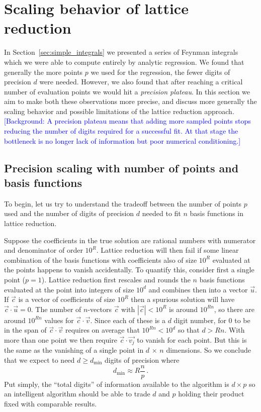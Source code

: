 \documentclass[a4paper,11pt]{article}
\newcommand{\dmin}{d_{\text{min}}}
\begin{document}
\section{Scaling behavior of lattice reduction}\label{sec:lll_limitations}

In Section~\ref{sec:simple_integrals} we presented a series of Feynman integrals which we were able to compute entirely by analytic regression. We found that generally the more points $p$ we used for the regression, the fewer digits of precision $d$ were needed. However, we also found that after reaching a critical number of evaluation points we would hit a \textit{precision plateau}. In this section we aim to make both these observations more precise, and discuss more generally the scaling behavior and possible limitations of  the lattice reduction approach.
\textcolor{blue}{\small [Background: A precision plateau means that adding more sampled points stops reducing the number of digits required for a successful fit. At that stage the bottleneck is no longer lack of information but poor numerical conditioning.]}



\subsection{Precision scaling with number of points and basis functions}\label{sec:p_d_scaling}


To begin, let us try to understand the tradeoff between the number of points $p$ used and the number of digits of precision $d$ needed to fit $n$ basis functions in lattice reduction.

Suppose the coefficients in the true solution are rational numbers with numerator and denominator of order $10^R$. Lattice reduction will then fail if some linear combination of the basis functions with coefficients also of size $10^R$ evaluated at the points happens to vanish accidentally. To quantify this, consider first a single point ($p=1$). Lattice reduction first rescales and rounds the $n$ basis functions evaluated at the point into integers of size $10^d$ and combines then into a vector $\vec{u}$. If $\vec{c}$ is a vector of coefficients of size $10^R$ then a spurious solution will have $\vec{c} \cdot \vec{u}=0$. The number of $n$-vectors $\vec{c}$ with $|\vec{c}| < 10^R$ is around $10^{Rn}$, so there are around $10^{Rn}$ values for $\vec{c} \cdot \vec{v}$. Since each of these is a $d$ digit number, for 0 to be in the span of $\vec{c} \cdot \vec{v}$  requires on average that $10^{Rn} < 10^d$ so that $d> R n$. With more than one point we then require 
$\vec{c} \cdot \vec{v_j}$ to vanish for each point. But this is the same as the vanishing of a single point in $d\, \times\,n$ dimensions. So we conclude that we expect to need $d \ge \dmin$ digits of precision where
\begin{equation}
    \dmin \approx R \frac{n }{p} \,.\label{theory}
\end{equation}
Put simply,
the ``total digits'' of information available to the algorithm is $d\times p$ so an intelligent algorithm should be able to trade $d$ and $p$ holding their product fixed with comparable results.
 
\end{document}
